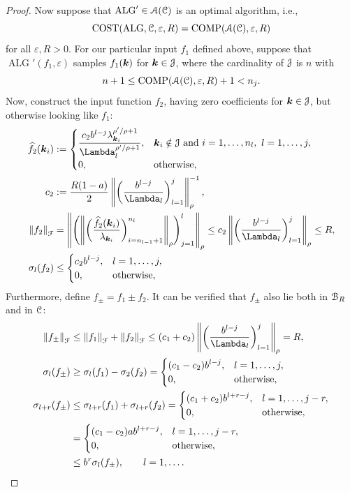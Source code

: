 \documentclass[USenglish]{article}
\theoremstyle{dgthm}
\theoremstyle{dgthm}
\theoremstyle{dgthm}
\theoremstyle{dgthm}
\theoremstyle{dgdef}
\theoremstyle{definition}
\DeclareMathOperator{\ALG}{ALG}
\DeclareMathOperator{\COST}{COST}
\DeclareMathOperator{\COMP}{COMP}
\newcommand{\hf}{\widehat{f}}
\newcommand{\norm}[2][{}]{\ensuremath{\left \lVert #2 \right \rVert}_{#1}}
\begin{document}
\begin{proof}
Now suppose that $\ALG' \in \calA(\calC)$ is an optimal algorithm, i.e., \[\COST(\ALG,\calC,\varepsilon,R) =  \COMP(\calA(\calC),\varepsilon,R)\]
for all $\varepsilon, R > 0$.  For our particular input $f_1$ defined above, suppose that $\ALG'(f_1,\varepsilon)$ samples $f_1({\boldsymbol{k}})$ for ${\boldsymbol{k}} \in {\mathcal{J}}$, where the cardinality of ${\mathcal{J}}$ is $n$ with 
\[
n + 1\le \COMP(\calA(\calC),\varepsilon,R) +1 < n_j.
\]  
Now, construct the input function $f_2$, having zero coefficients for ${\boldsymbol{k}} \in {\mathcal{J}}$, but otherwise looking like $f_1$:
\begin{align}
\nonumber
\hf_2(\bsk_i) &:= \begin{cases}
\displaystyle
\frac{c_2 b^{l-j} \lambda_{\bsk_i}^{\rho'/\rho+1}}{\Lambda_l^{\rho'/\rho+1}},  & \bsk_i \notin \calJ \text{ and } i =  1, \ldots, n_l, \ l = 1, \ldots, j,
\\
0, & \text{otherwise},
\end{cases}
\\
\nonumber
c_2 &:= \frac{R(1-a)}{2} \norm[\rho]{ \biggl(\frac{b^{l-j}}{\Lambda_l} \biggr)_{l=1}^j }^{-1}, \\
\norm[\calF]{f_2} &= \norm[\rho]{\Biggl( \norm[\rho]{\biggl(\frac{\hf_2(\bsk_i)}{\lambda_{\bsk_i}} \biggr)_{i = n_{l-1} + 1}^{n_l}} \Biggr)_{j=1}^l } 
\le  c_2 \norm[\rho]{ \biggl(\frac{b^{l-j}}{\Lambda_l} \biggr)_{l=1}^j } \le R, \\
\sigma_l(f_2) & \le \begin{cases}
\displaystyle
c_2 b^{l-j}, & l =1, \ldots, j, \\
0, & \text{otherwise},
\end{cases}
\end{align}
Furthermore, define $f_{\pm} = f_1 \pm f_2$.
It can be verified that $f_{\pm}$ also lie both in ${\mathcal{B}}_{R}$ and in ${\mathcal{C}}$:
\begin{align}
\nonumber
\norm[\calF]{f_\pm} &\le \norm[\calF]{f_1} + \norm[\calF]{f_2} \le (c_1 + c_2) \norm[\rho]{ \biggl(\frac{b^{l-j}}{\Lambda_l} \biggr)_{l=1}^j } = R,
\\
\nonumber
\sigma_l(f_\pm) & \ge \sigma_l(f_1) - \sigma_2(f_2) = \begin{cases}
\displaystyle
(c_1 - c_2) b^{l-j}, & l =1, \ldots, j, \\
0, & \text{otherwise},
\end{cases}
\\
\nonumber
\sigma_{l+r}(f_\pm) & \le \sigma_{l+r}(f_1) + \sigma_{l+r}(f_2) = \begin{cases}
\displaystyle
(c_1+c_2) b^{l+r-j}, & l =1, \ldots, j-r, \\
0, & \text{otherwise},
\end{cases}
\\
\nonumber
& = \begin{cases}
\displaystyle
(c_1 - c_2) a b^{l+r-j}, & l =1, \ldots, j-r, \\
0, & \text{otherwise},
\end{cases}
\\
\nonumber
& \le b^r \sigma_l(f_\pm), \qquad l =1, \ldots .
\end{align}


\end{proof}
\end{document}
